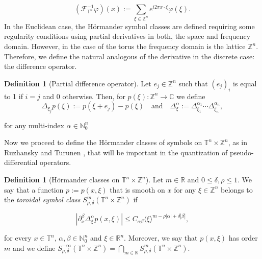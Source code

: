 \documentclass[12pt, reqno]{amsart}
\theoremstyle{definition}
\newtheorem{definition}[theorem]{Definition}
\theoremstyle{remark}
\numberwithin{equation}{section}
\begin{document}
    \begin{equation*}
        (\mathcal{F}_{\mathbb{T}^n}^{-1}\varphi)(x) := \sum_{\xi \in \mathbb{Z}^n} e^{i2\pi x \cdot \xi} \varphi(\xi).
    \end{equation*}
In the Euclidean case, the Hörmander symbol classes are defined requiring some regularity conditions using partial derivatives in both, the space and frequency domain. However, in the case of the torus the frequency domain is the lattice $\mathbb{Z}^n$. Therefore, we define the natural analogous of the derivative in the discrete case: the difference operator.
\begin{definition}[Partial difference operator]
    Let $e_j \in \mathbb{Z}^n$ such that $(e_j)_i$ is equal to 1 if $i=j$ and 0 otherwise. Then, for $p(\xi):\mathbb{Z}^n \rightarrow \mathbb{C} $ we define 
    \begin{equation*}
        \Delta_{\xi_j}p(\xi) := p(\xi + e_j) - p(\xi) \quad \text{and} \quad \Delta^\alpha_\xi := \Delta_{\xi_1}^{\alpha_1} \cdots \Delta_{\xi_n}^{\alpha_n},
    \end{equation*}
    
    for any multi-index $\alpha \in \mathbb{N}^n_0$
\end{definition}
Now we proceed to define the Hörmander classes of symbols on $ \mathbb{T}^n \times \mathbb{Z}^n $, as in Ruzhansky and Turunen \cite{ruzhansky-turunen}, that will be important in the quantization of pseudo-differential operators.
\begin{definition}[Hörmander classes on $ \mathbb{T}^n \times \mathbb{Z}^n $]
    Let $m \in \mathbb{R} $ and $0 \leq \delta, \rho\leq 1$. We say that a function $p:=p(x, \xi)$ that is smooth on $x$ for any $\xi \in \mathbb{Z}^n$ belongs to the \textit{toroidal symbol class} $S^m_{\rho,\delta} (\mathbb{T}^n\times \mathbb{Z}^n) $ if 

    \begin{equation*}
        \left|\partial^\beta_x \Delta^\alpha_\xi p(x, \xi)\right| \leq C_{\alpha\beta}\langle\xi\rangle^{m-\rho|\alpha| + \delta|\beta|},
    \end{equation*}
    
    for every $x \in \mathbb{T}^n$, $\alpha, \beta \in \mathbb{N}^n_0$ and $\xi \in \mathbb{R}^n$. Moreover, we say that $p(x, \xi)$ has order $m$ and we define $S^{-\infty}_{\rho,\delta} (\mathbb{T}^n\times \mathbb{Z}^n) = \bigcap_{m\in\mathbb{R}}S^m_{\rho,\delta} (\mathbb{T}^n\times \mathbb{Z}^n) $.
\end{definition}
\end{document}
